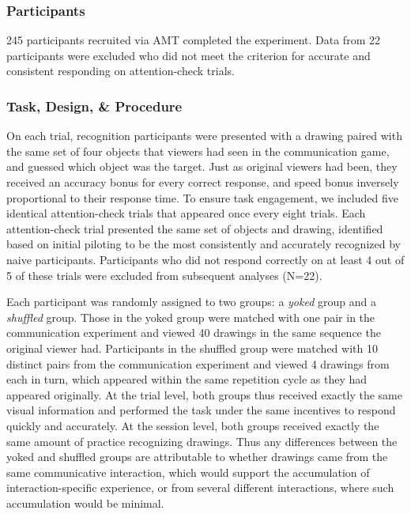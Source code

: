\documentclass[10pt,letterpaper]{article}
\begin{document}
\subsubsection{Participants}

245 participants recruited via AMT completed the experiment. Data from 22 participants were excluded who did not meet the criterion for accurate and consistent responding on attention-check trials.

\subsubsection{Task, Design, \& Procedure}

On each trial, recognition participants were presented with a drawing paired with the same set of four objects that viewers had seen in the communication game, and guessed which object was the target. 
Just as original viewers had been, they received an accuracy bonus for every correct response, and speed bonus inversely proportional to their response time. 
To ensure task engagement, we included five identical attention-check trials that appeared once every eight trials. 
Each attention-check trial presented the same set of objects and drawing, identified based on initial piloting to be the most consistently and accurately recognized by naive participants. 
Participants who did not respond correctly on at least 4 out of 5 of these trials were excluded from subsequent analyses (N=22).

Each participant was randomly assigned to two groups: a \textit{yoked} group and a \textit{shuffled} group. 
Those in the yoked group were matched with one pair in the communication experiment and viewed 40 drawings in the same sequence the original viewer had. 
Participants in the shuffled group were matched with 10 distinct pairs from the communication experiment and viewed 4 drawings from each in turn, which appeared within the same repetition cycle as they had appeared originally. 
At the trial level, both groups thus received exactly the same visual information and performed the task under the same incentives to respond quickly and accurately. 
At the session level, both groups received exactly the same amount of practice recognizing drawings.
Thus any differences between the yoked and shuffled groups are attributable to whether drawings came from the same communicative interaction, which would support the accumulation of interaction-specific experience, or from several different interactions, where such accumulation would be minimal.
\end{document}

